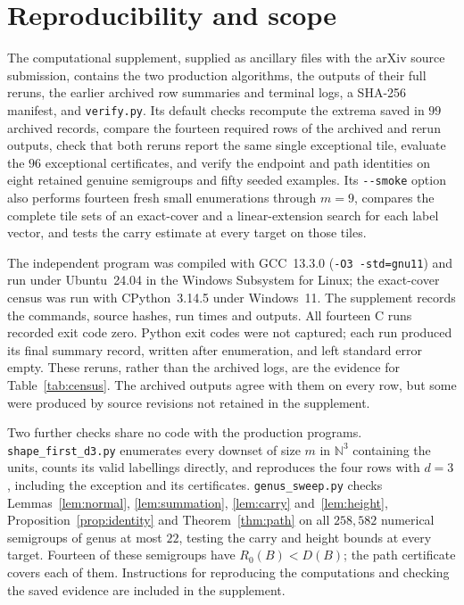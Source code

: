 \documentclass[11pt]{article}
\theoremstyle{definition}
\theoremstyle{remark}
\newcommand{\N}{\mathbb{N}}
\begin{document}
\section{Reproducibility and scope}

The computational supplement, supplied as ancillary files with the
arXiv source submission, contains the two production algorithms, the
outputs of their full reruns, the earlier archived row summaries and
terminal logs, a SHA-256 manifest, and \texttt{verify.py}. Its default
checks recompute the extrema saved in $99$ archived records, compare
the fourteen required rows of the archived and rerun outputs, check
that both reruns report the same single exceptional tile, evaluate the
$96$ exceptional certificates, and verify the endpoint and path
identities on eight retained genuine semigroups and fifty seeded
examples. Its \texttt{-{}-smoke} option also performs fourteen fresh
small enumerations through $m=9$, compares the complete tile sets of
an exact-cover and a linear-extension search for each label vector,
and tests the carry estimate at every target on those tiles.

The independent program was compiled with GCC~13.3.0
(\texttt{-O3 -std=gnu11}) and run under Ubuntu~24.04 in the Windows
Subsystem for Linux; the exact-cover census was run with CPython~3.14.5
under Windows~11. The supplement records the commands, source hashes,
run times and outputs. All fourteen C runs recorded exit code zero.
Python exit codes were not captured; each run produced its final summary
record, written after enumeration, and left standard error empty.
These reruns, rather than the archived
logs, are the evidence for Table~\ref{tab:census}. The archived outputs
agree with them on every row, but some were produced by source
revisions not retained in the supplement.

Two further checks share no code with the production programs.
\texttt{shape\_first\_d3.py} enumerates every downset of size $m$ in
$\N^3$ containing the units, counts its valid labellings directly, and
reproduces the four rows with $d=3$, including the exception and its
certificates. \texttt{genus\_sweep.py} checks
Lemmas~\ref{lem:normal}, \ref{lem:summation}, \ref{lem:carry}
and~\ref{lem:height}, Proposition~\ref{prop:identity} and
Theorem~\ref{thm:path} on all $258{,}582$ numerical semigroups of genus
at most $22$, testing the carry and height bounds at every target.
Fourteen of these semigroups have $R_0(B)<D(B)$; the path certificate
covers each of them. Instructions for reproducing the computations and
checking the saved evidence are included in the supplement.
\end{document}

